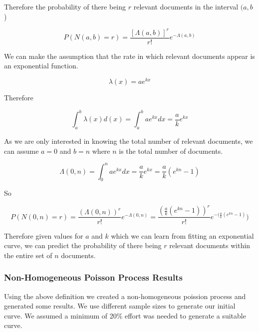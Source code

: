 Therefore the probability of there being $r$ relevant documents in the interval $(a, b$)

\begin{equation}
	   P(N(a, b) = r) = \frac{[\Lambda(a,b)]^r}{r!} e^{-\Lambda(a,b)}
\end{equation}

We can make the assumption that the rate in which relevant documents appear is an exponential function.

\begin{equation}
	   \lambda(x) = ae^{kx}
\end{equation}

Therefore

\begin{equation}
	   \int_a^b \lambda(x) d(x) = \int_a^b ae^{kx} dx = \frac{a}{k}e^{kx}
\end{equation}

As we are only interested in knowing the total number of relevant documents, we can assume $a=0$ and $b=n$ where $n$ is the total number of documents.

\begin{equation}
	   \Lambda(0, n) = \int_0^n ae^{kx}dx = \frac{a}{k}e^{kx} = \frac{a}{k}(e^{kn} - 1)
\end{equation}

So

\begin{equation}
	   P(N(0,n) = r) = \frac{(\Lambda(0,n))^r}{r!}e^{-\Lambda(0,n)} = \frac{\left(\frac{a}{k}(e^{kn} -1)\right)^r}{r!} e^{-(\frac{a}{k}(e^{kn} - 1)})
\end{equation}

Therefore given values for $a$ and $k$ which we can learn from fitting an exponential curve, we can predict the probability of there being $r$ relevant documents within the entire set of $n$ documents.


\subsubsection{Non-Homogeneous Poisson Process Results} \label{nn_pp_def}

Using the above definition we created a non-homogeneous poission process and generated some results. We use different sample sizes to generate our initial curve. We assumed a minimum of 20\% effort was needed to generate a suitable curve.

